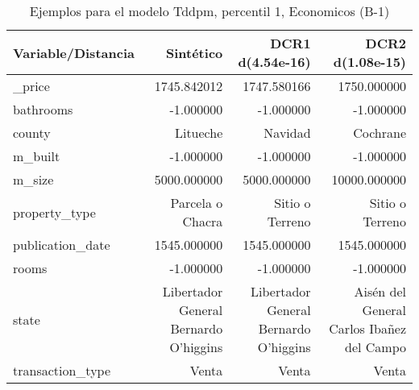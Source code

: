 \begin{table}[H]
\centering
\fontsize{10}{14}\selectfont
\caption{Ejemplos para el modelo Tddpm, percentil 1, Economicos (B-1)}
\label{table-example-economicos-b-1-tddpm_mlp-1p}
\begin{tabular}{|l|r|r|r|}
\hline
\rowcolor[gray]{0.8}
Variable/Distancia & Sintético & DCR1 d(4.54e-16) & DCR2 d(1.08e-15) \\
\hline \_price & \cellcolor[rgb]{0.9, 0.54, 0.52} 1745.842012 & 1747.580166 & 1750.000000 \\
\hline bathrooms & \cellcolor[rgb]{0.9, 0.54, 0.52} -1.000000 & \cellcolor[rgb]{0.9, 0.54, 0.52} -1.000000 & \cellcolor[rgb]{0.9, 0.54, 0.52} -1.000000 \\
\hline county & \cellcolor[rgb]{0.9, 0.54, 0.52} Litueche & Navidad & Cochrane \\
\hline m\_built & \cellcolor[rgb]{0.9, 0.54, 0.52} -1.000000 & \cellcolor[rgb]{0.9, 0.54, 0.52} -1.000000 & \cellcolor[rgb]{0.9, 0.54, 0.52} -1.000000 \\
\hline m\_size & \cellcolor[rgb]{0.9, 0.54, 0.52} 5000.000000 & \cellcolor[rgb]{0.9, 0.54, 0.52} 5000.000000 & 10000.000000 \\
\hline property\_type & \cellcolor[rgb]{0.9, 0.54, 0.52} Parcela o Chacra & Sitio o Terreno & Sitio o Terreno \\
\hline publication\_date & \cellcolor[rgb]{0.9, 0.54, 0.52} 1545.000000 & \cellcolor[rgb]{0.9, 0.54, 0.52} 1545.000000 & \cellcolor[rgb]{0.9, 0.54, 0.52} 1545.000000 \\
\hline rooms & \cellcolor[rgb]{0.9, 0.54, 0.52} -1.000000 & \cellcolor[rgb]{0.9, 0.54, 0.52} -1.000000 & \cellcolor[rgb]{0.9, 0.54, 0.52} -1.000000 \\
\hline state & \cellcolor[rgb]{0.9, 0.54, 0.52} Libertador General Bernardo O'higgins & \cellcolor[rgb]{0.9, 0.54, 0.52} Libertador General Bernardo O'higgins & Aisén del General Carlos Ibañez del Campo \\
\hline transaction\_type & \cellcolor[rgb]{0.9, 0.54, 0.52} Venta & \cellcolor[rgb]{0.9, 0.54, 0.52} Venta & \cellcolor[rgb]{0.9, 0.54, 0.52} Venta \\
\hline
\end{tabular}
\end{table}

